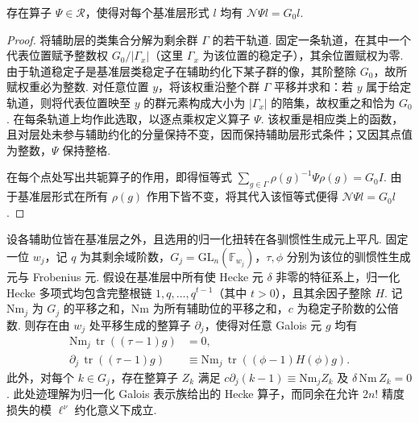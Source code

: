 \begin{lemma}[以剩余群范数升降基准层]
\label{lem:c-auxiliary-norm}
\emitthmsource
存在算子 $\Psi\in\mathcal R$，使得对每个基准层形式 $l$ 均有 $\mathcal N\Psi l=G_0 l$.
\end{lemma}
\begin{proof}
将辅助层的类集合分解为剩余群 $\Gamma$ 的若干轨道. 固定一条轨道，在其中一个代表位置赋予整数权 $G_0/|\Gamma_x|$（这里 $\Gamma_x$ 为该位置的稳定子），其余位置赋权为零.
由于轨道稳定子是基准层类稳定子在辅助约化下某子群的像，其阶整除 $G_0$，故所赋权重必为整数.
对任意位置 $y$，将该权重沿整个群 $\Gamma$ 平移并求和：若 $y$ 属于给定轨道，则将代表位置映至 $y$ 的群元素构成大小为 $|\Gamma_x|$ 的陪集，故权重之和恰为 $G_0$.
在每条轨道上均作此选取，以逐点乘权定义算子 $\Psi$.
该权重是相应类上的函数，且对层处未参与辅助约化的分量保持不变，因而保持辅助层形式条件；又因其点值为整数，$\Psi$ 保持整格.

在每个点处写出共轭算子的作用，即得恒等式 $\sum_{g\in\Gamma}\rho(g)^{-1}\Psi\rho(g)=G_0 I$.
由于基准层形式在所有 $\rho(g)$ 作用下皆不变，将其代入该恒等式便得 $\mathcal N\Psi l=G_0 l$.
\end{proof}

\begin{lemma}[单辅助位的迹关系与局部导数算子]
\label{lem:c-auxiliary-local-tie}
\emitthmsource
设各辅助位皆在基准层之外，且选用的归一化扭转在各驯惯性生成元上平凡. 固定一位 $w_j$，记 $q$ 为其剩余域阶数，$G_j=\mathrm{GL}_n(\mathbb F_{w_j})$，$\tau,\phi$ 分别为该位的驯惯性生成元与 Frobenius 元. 假设在基准层中所有使 Hecke 元 $\delta$ 非零的特征系上，归一化 Hecke 多项式均包含完整根链 $1,q,\dots,q^{t-1}$（其中 $t>0$），且其余因子整除 $H$. 记 $\mathrm{Nm}_j$ 为 $G_j$ 的平移之和，$\mathrm{Nm}$ 为所有辅助位的平移之和，$c$ 为稳定子阶数的公倍数. 则存在由 $w_j$ 处平移生成的整算子 $\partial_j$，使得对任意 Galois 元 $g$ 均有
\[
 \begin{aligned}
 \mathrm{Nm}_j\,\operatorname{tr}((\tau-1)g)&=0,\\
 \partial_j\,\operatorname{tr}((\tau-1)g)
 &\equiv \mathrm{Nm}_j\,\operatorname{tr}((\phi-1)H(\phi)g).
 \end{aligned}
\]
此外，对每个 $k\in G_j$，存在整算子 $Z_k$ 满足 $c\partial_j(k-1)\equiv\mathrm{Nm}_jZ_k$ 及 $\delta\,\mathrm{Nm}\,Z_k=0$. 此处迹理解为归一化 Galois 表示族给出的 Hecke 算子，而同余在允许 $2n!$ 精度损失的模 $\ell^\nu$ 约化意义下成立.
\end{lemma}

